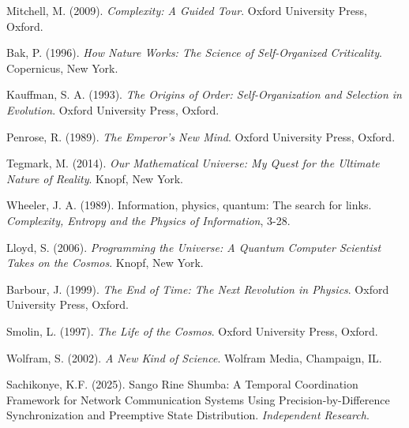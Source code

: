\documentclass[12pt,a4paper]{article}
\begin{document}
\begin{thebibliography}{99}
 Mitchell, M. (2009). \textit{Complexity: A Guided Tour}. Oxford University Press, Oxford.

 Bak, P. (1996). \textit{How Nature Works: The Science of Self-Organized Criticality}. Copernicus, New York.

 Kauffman, S. A. (1993). \textit{The Origins of Order: Self-Organization and Selection in Evolution}. Oxford University Press, Oxford.

 Penrose, R. (1989). \textit{The Emperor's New Mind}. Oxford University Press, Oxford.

 Tegmark, M. (2014). \textit{Our Mathematical Universe: My Quest for the Ultimate Nature of Reality}. Knopf, New York.

 Wheeler, J. A. (1989). Information, physics, quantum: The search for links. \textit{Complexity, Entropy and the Physics of Information}, 3-28.

 Lloyd, S. (2006). \textit{Programming the Universe: A Quantum Computer Scientist Takes on the Cosmos}. Knopf, New York.

 Barbour, J. (1999). \textit{The End of Time: The Next Revolution in Physics}. Oxford University Press, Oxford.

 Smolin, L. (1997). \textit{The Life of the Cosmos}. Oxford University Press, Oxford.

 Wolfram, S. (2002). \textit{A New Kind of Science}. Wolfram Media, Champaign, IL.

 Sachikonye, K.F. (2025). Sango Rine Shumba: A Temporal Coordination Framework for Network Communication Systems Using Precision-by-Difference Synchronization and Preemptive State Distribution. \textit{Independent Research}.

\end{thebibliography}
\end{document}

